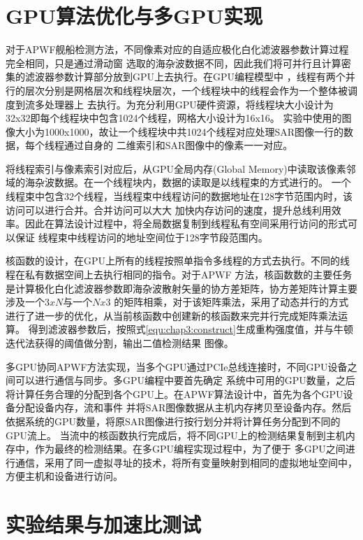 \section{GPU算法优化与多GPU实现}
 对于APWF舰船检测方法，不同像素对应的自适应极化白化滤波器参数计算过程完全相同，只是通过滑动窗
 选取的海杂波数据不同，因此我们将可并行且计算密集的滤波器参数计算部分放到GPU上去执行。在GPU编程模型中
 ，线程有两个并行的层次分别是网格层次和线程块层次，一个线程块中的线程会作为一个整体被调度到流多处理器上
 去执行。为充分利用GPU硬件资源，将线程块大小设计为32x32即每个线程块中包含1024个线程，网格大小设计为16x16。
 实验中使用的图像大小为1000x1000，故让一个线程块中共1024个线程对应处理SAR图像一行的数据，每个线程通过自身的
 二维索引和SAR图像中的像素一一对应。

 将线程索引与像素索引对应后，从GPU全局内存(Global Memory)中读取该像素邻域的海杂波数据。在一个线程块内，数据的读取是以线程束的方式进行的。
 一个线程束中包含32个线程，当线程束中线程访问的数据地址在128字节范围内时，该访问可以进行合并。合并访问可以大大
 加快内存访问的速度，提升总线利用效率。因此在算法设计过程中，将全局数据复制到线程私有空间采用行访问的形式可以保证
 线程束中线程访问的地址空间位于128字节段范围内。

 核函数的设计，在GPU上所有的线程按照单指令多线程的方式去执行。不同的线程在私有数据空间上去执行相同的指令。对于APWF
 方法，核函数数的主要任务是计算极化白化滤波器参数即海杂波散射矢量的协方差矩阵，协方差矩阵计算主要涉及一个$3xN$与一个$Nx3$
 的矩阵相乘，对于该矩阵乘法，采用了动态并行的方式进行了进一步的优化，从当前核函数中创建新的核函数来完并行完成矩阵乘法运算。
 得到滤波器参数后，按照式\ref{equ:chap3:construct}生成重构强度值，并与牛顿迭代法获得的阈值做分割，输出二值检测结果
 图像。

 多GPU协同APWF方法实现，当多个GPU通过PCIe总线连接时，不同GPU设备之间可以进行通信与同步。多GPU编程中要首先确定
 系统中可用的GPU数量，之后将计算任务合理的分配到各个GPU上。在APWF算法设计中，首先为各个GPU设备分配设备内存，流和事件
 并将SAR图像数据从主机内存拷贝至设备内存。然后依据系统的GPU数量，将原SAR图像进行按行划分并将计算任务分配到不同的GPU流上。
 当流中的核函数执行完成后，将不同GPU上的检测结果复制到主机内存中，作为最终的检测结果。在多GPU编程实现过程中，为了便于
 多GPU之间进行通信，采用了同一虚拟寻址的技术，将所有变量映射到相同的虚拟地址空间中，方便主机和设备进行访问。

 \section{实验结果与加速比测试}

